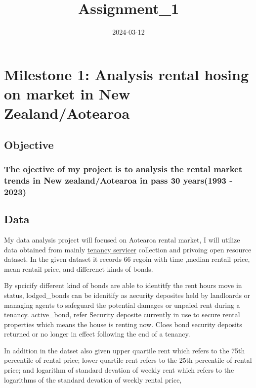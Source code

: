 \documentclass[
]{article}
\title{Assignment\_1}
\author{}
\date{\vspace{-2.5em}2024-03-12}
\begin{document}
\maketitle

\section{Milestone 1: Analysis rental hosing on market in New
Zealand/Aotearoa}\label{milestone-1-analysis-rental-hosing-on-market-in-new-zealandaotearoa}

\subsection{Objective}\label{objective}

\subsubsection{The ojective of my project is to analysis the rental
market trends in New zealand/Aotearoa in pass 30 years(1993 -
2023)}\label{the-ojective-of-my-project-is-to-analysis-the-rental-market-trends-in-new-zealandaotearoa-in-pass-30-years1993---2023}

\subsection{Data}\label{data}

My data analysis project will focused on Aotearoa rental market, I will
utilize data obtained from mainly
\href{https://www.tenancy.govt.nz/about-tenancy-services/data-and-statistics/rental-bond-data/}{tenancy
servicer} collection and privoing open resource dataset. In the given
dataset it records 66 regoin with time ,median rentail price, mean
rentail price, and differenct kinds of bonds.

By spcicify different kind of bonds are able to identitfy the rent hours
move in status, lodged\_bonds can be idenitify as aecurity deposites
held by landloards or managing agents to safeguard the potential damages
or unpaied rent during a tenancy. active\_bond, refer Security deposite
currently in use to secure rental properties which means the house is
renting now. Cloes bond security deposits returned or no longer in
effect following the end of a tenancy.

In addition in the datset also given upper quartile rent which refers to
the 75th percentile of rental price; lower quartile rent refers to the
25th percentile of rental price; and logarithm of standard devation of
weekly rent which refers to the logarithms of the standard devation of
weekly rental price,
\end{document}
